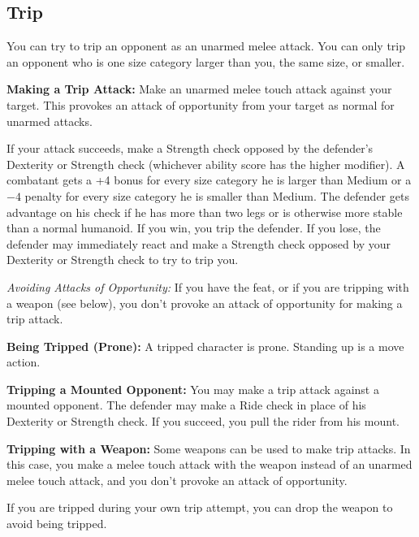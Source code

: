 \subsection{Trip}
You can try to trip an opponent as an unarmed melee attack. You can only trip an opponent who is one size category larger than you, the same size, or smaller.

\textbf{Making a Trip Attack:} Make an unarmed melee touch attack against your target. This provokes an attack of opportunity from your target as normal for unarmed attacks.

If your attack succeeds, make a Strength check opposed by the defender's Dexterity or Strength check (whichever ability score has the higher modifier). A combatant gets a +4 bonus for every size category he is larger than Medium or a $-4$ penalty for every size category he is smaller than Medium. The defender gets advantage on his check if he has more than two legs or is otherwise more stable than a normal humanoid. If you win, you trip the defender. If you lose, the defender may immediately react and make a Strength check opposed by your Dexterity or Strength check to try to trip you.

\textit{Avoiding Attacks of Opportunity:} If you have the  feat, or if you are tripping with a weapon (see below), you don't provoke an attack of opportunity for making a trip attack.

\textbf{Being Tripped (Prone):} A tripped character is prone. Standing up is a move action.

\textbf{Tripping a Mounted Opponent:} You may make a trip attack against a mounted opponent. The defender may make a Ride check in place of his Dexterity or Strength check. If you succeed, you pull the rider from his mount.

\textbf{Tripping with a Weapon:} Some weapons can be used to make trip attacks. In this case, you make a melee touch attack with the weapon instead of an unarmed melee touch attack, and you don't provoke an attack of opportunity.

If you are tripped during your own trip attempt, you can drop the weapon to avoid being tripped.